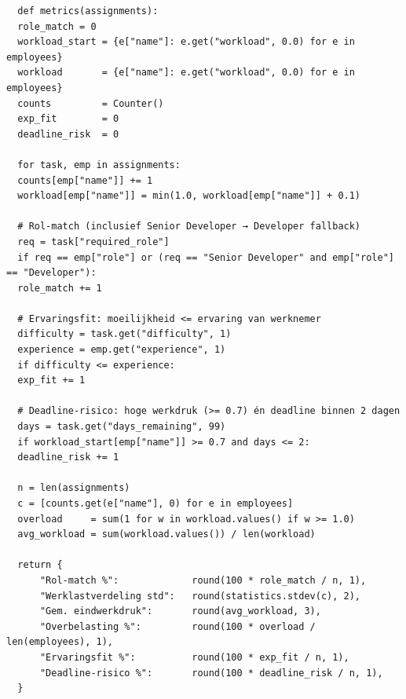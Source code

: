\begin{listing}
  \begin{verbatim}
  def metrics(assignments):
  role_match = 0
  workload_start = {e["name"]: e.get("workload", 0.0) for e in employees}
  workload       = {e["name"]: e.get("workload", 0.0) for e in employees}
  counts         = Counter()
  exp_fit        = 0
  deadline_risk  = 0
  
  for task, emp in assignments:
  counts[emp["name"]] += 1
  workload[emp["name"]] = min(1.0, workload[emp["name"]] + 0.1)
  
  # Rol-match (inclusief Senior Developer → Developer fallback)
  req = task["required_role"]
  if req == emp["role"] or (req == "Senior Developer" and emp["role"] == "Developer"):
  role_match += 1
  
  # Ervaringsfit: moeilijkheid <= ervaring van werknemer
  difficulty = task.get("difficulty", 1)
  experience = emp.get("experience", 1)
  if difficulty <= experience:
  exp_fit += 1
  
  # Deadline-risico: hoge werkdruk (>= 0.7) én deadline binnen 2 dagen
  days = task.get("days_remaining", 99)
  if workload_start[emp["name"]] >= 0.7 and days <= 2:
  deadline_risk += 1
  
  n = len(assignments)
  c = [counts.get(e["name"], 0) for e in employees]
  overload     = sum(1 for w in workload.values() if w >= 1.0)
  avg_workload = sum(workload.values()) / len(workload)
  
  return {
      "Rol-match %":             round(100 * role_match / n, 1),
      "Werklastverdeling std":   round(statistics.stdev(c), 2),
      "Gem. eindwerkdruk":       round(avg_workload, 3),
      "Overbelasting %":         round(100 * overload / len(employees), 1),
      "Ervaringsfit %":          round(100 * exp_fit / n, 1),
      "Deadline-risico %":       round(100 * deadline_risk / n, 1),
  }
      \end{verbatim}
  \caption[Een deel van het evaluatiescript]{Een deel van het evaluatiescript waarin de code staat voor de metrics.}
\end{listing}

